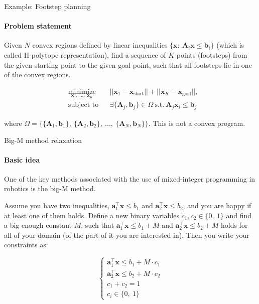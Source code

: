 \documentclass{beamer}
\begin{document}
\begin{frame}{Example: Footstep planning}
\framesubtitle{Problem statement}
\begin{flushleft}

Given $N$ convex regions defined by linear inequalities $\{ \mathbf{x}: \  \mathbf{A}_i \mathbf{x} \leq \mathbf{b}_i \}$ (which is called H-polytope representation), find a sequence of $K$ points (footsteps) from the given starting point to the given goal point, such that all footsteps lie in one of the convex regions.

\begin{equation}
\begin{aligned}
& \underset{\mathbf{x}_1, \ ..., \ \mathbf{x}_K}{\text{minimize}}
& & ||\mathbf{x}_1 - \mathbf{x}_{\text{start}}|| + ||\mathbf{x}_K - \mathbf{x}_{\text{goal}}||, \\
& \text{subject to}
& & \exists \{ \mathbf{A}_j, \mathbf{b}_j\} \in \Omega \ \text{s.t.} \ \mathbf{A}_j\mathbf{x}_i \leq \mathbf{b}_j
\end{aligned}
\end{equation}

\bigskip

where $\Omega = \{ \{ \mathbf{A}_1, \mathbf{b}_1\}, \ \{ \mathbf{A}_2, \mathbf{b}_2\}, \ ..., \ \{ \mathbf{A}_N, \mathbf{b}_N\} \}$. This is not a convex program.
 
\end{flushleft}
\end{frame}




\begin{frame}{Big-M method relaxation}
\framesubtitle{Basic idea}
\begin{flushleft}


One of the key methods associated with the use of mixed-integer programming in robotics is the big-M method. 

\bigskip

Assume you have two inequalities, $\mathbf{a}_1^\top \mathbf{x} \leq b_1$ and $\mathbf{a}_2^\top \mathbf{x} \leq b_2$, and you are happy if at least one of them holds. Define a new binary variables $c_1, c_2 \in \{0, \ 1 \}$ and find a big enough constant $M$, such that $\mathbf{a}_1^\top \mathbf{x} \leq b_1 + M$ and $\mathbf{a}_2^\top \mathbf{x} \leq b_2 + M$ holds for all of your domain (of the part of it you are interested in). Then you write your constraints as:

\begin{equation}
    \begin{cases}
    \mathbf{a}_1^\top \mathbf{x} \leq b_1 + M \cdot c_1 \\
    \mathbf{a}_2^\top \mathbf{x} \leq b_2 + M \cdot c_2 \\
    c_1 + c_2 = 1  \\
    c_i  \in \{0, \ 1 \}
    \end{cases}
\end{equation}

\end{flushleft}
\end{frame}
\end{document}
